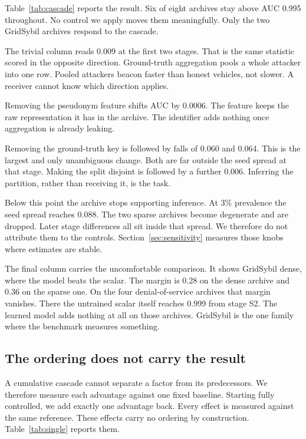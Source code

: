 \documentclass[journal,twoside]{IEEEtran}
\begin{document}
Table~\ref{tab:cascade} reports the result.
Six of eight archives stay above AUC 0.995 throughout.
No control we apply moves them meaningfully.
Only the two GridSybil archives respond to the cascade.

The trivial column reads 0.009 at the first two stages.
That is the same statistic scored in the opposite direction.
Ground-truth aggregation pools a whole attacker into one row.
Pooled attackers beacon faster than honest vehicles, not slower.
A receiver cannot know which direction applies.

Removing the pseudonym feature shifts AUC by 0.0006.
The feature keeps the raw representation it has in the archive.
The identifier adds nothing once aggregation is already leaking.

Removing the ground-truth key is followed by falls of 0.060 and 0.064.
This is the largest and only unambiguous change.
Both are far outside the seed spread at that stage.
Making the split disjoint is followed by a further 0.006.
Inferring the partition, rather than receiving it, is the task.

Below this point the archive stops supporting inference.
At 3\% prevalence the seed spread reaches 0.088.
The two sparse archives become degenerate and are dropped.
Later stage differences all sit inside that spread.
We therefore do not attribute them to the controls.
Section~\ref{sec:sensitivity} measures those knobs where estimates are stable.

The final column carries the uncomfortable comparison.
It shows GridSybil dense, where the model beats the scalar.
The margin is 0.28 on the dense archive and 0.36 on the sparse one.
On the four denial-of-service archives that margin vanishes.
There the untrained scalar itself reaches 0.999 from stage S2.
The learned model adds nothing at all on those archives.
GridSybil is the one family where the benchmark measures something.

\subsection{The ordering does not carry the result}
\label{sec:single}

A cumulative cascade cannot separate a factor from its predecessors.
We therefore measure each advantage against one fixed baseline.
Starting fully controlled, we add exactly one advantage back.
Every effect is measured against the same reference.
These effects carry no ordering by construction.
Table~\ref{tab:single} reports them.
\end{document}
